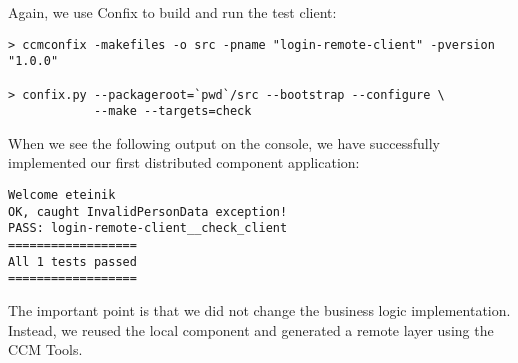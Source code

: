 Again, we use Confix to build and run the test client:
\begin{verbatim}
> ccmconfix -makefiles -o src -pname "login-remote-client" -pversion "1.0.0"

> confix.py --packageroot=`pwd`/src --bootstrap --configure \
            --make --targets=check
\end{verbatim}

When we see the following output on the console, we have successfully
implemented our first distributed component application:
\begin{verbatim}
Welcome eteinik
OK, caught InvalidPersonData exception!
PASS: login-remote-client__check_client
==================
All 1 tests passed
==================
\end{verbatim}

The important point is that we did not change the business logic implementation.
Instead, we reused the local component and generated a remote layer using the
CCM Tools.


\newpage